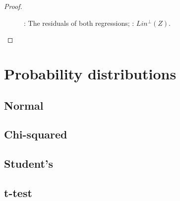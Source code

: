 \documentclass[nobib]{tufte-handout}
\theoremstyle{definition}
\begin{document}
\begin{proof}
\begin{figure}[ht!]
\begin{center}
\caption{: The residuals of both regressions;
: $Lin^{\perp}(Z)$.}
\end{center}
\end{figure}
\end{proof}

\section{Probability distributions}

\subsection{Normal}

\subsection{Chi-squared}

\subsection{Student's}

\subsection{t-test}
\end{document}
